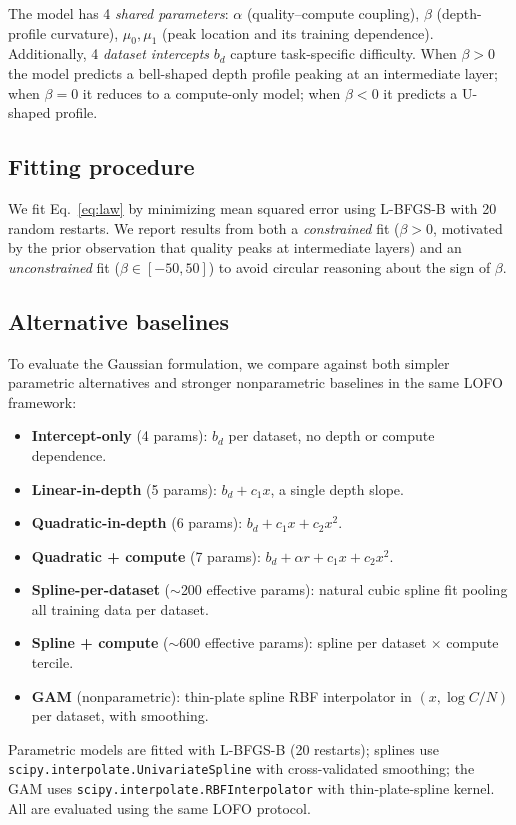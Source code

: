 \documentclass{article}
\begin{document}
The model has 4 \emph{shared parameters}: $\alpha$ (quality--compute coupling), $\beta$ (depth-profile curvature), $\mu_0, \mu_1$ (peak location and its training dependence). Additionally, 4 \emph{dataset intercepts} $b_d$ capture task-specific difficulty. When $\beta > 0$ the model predicts a bell-shaped depth profile peaking at an intermediate layer; when $\beta = 0$ it reduces to a compute-only model; when $\beta < 0$ it predicts a U-shaped profile.

\subsection{Fitting procedure}

We fit Eq.~\ref{eq:law} by minimizing mean squared error using L-BFGS-B with 20 random restarts. We report results from both a \emph{constrained} fit ($\beta > 0$, motivated by the prior observation that quality peaks at intermediate layers) and an \emph{unconstrained} fit ($\beta \in [-50, 50]$) to avoid circular reasoning about the sign of $\beta$.

\subsection{Alternative baselines}

To evaluate the Gaussian formulation, we compare against both simpler parametric alternatives and stronger nonparametric baselines in the same LOFO framework:
\begin{itemize}
    \item \textbf{Intercept-only} (4 params): $b_d$ per dataset, no depth or compute dependence.
    \item \textbf{Linear-in-depth} (5 params): $b_d + c_1 x$, a single depth slope.
    \item \textbf{Quadratic-in-depth} (6 params): $b_d + c_1 x + c_2 x^2$.
    \item \textbf{Quadratic + compute} (7 params): $b_d + \alpha r + c_1 x + c_2 x^2$.
    \item \textbf{Spline-per-dataset} ($\sim$200 effective params): natural cubic spline fit pooling all training data per dataset.
    \item \textbf{Spline + compute} ($\sim$600 effective params): spline per dataset $\times$ compute tercile.
    \item \textbf{GAM} (nonparametric): thin-plate spline RBF interpolator in $(x, \log C/N)$ per dataset, with smoothing.
\end{itemize}
Parametric models are fitted with L-BFGS-B (20 restarts); splines use \texttt{scipy.interpolate.UnivariateSpline} with cross-validated smoothing; the GAM uses \texttt{scipy.interpolate.RBFInterpolator} with thin-plate-spline kernel. All are evaluated using the same LOFO protocol.
\end{document}
